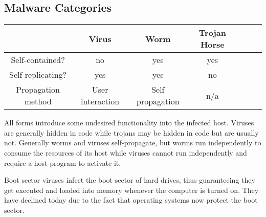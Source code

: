 \documentclass{math}
\begin{document}
\subsection*{Malware Categories}
\begin{center}
  \begin{tabular}{|c|c|c|c|c|c|c|}
    \hline
    & Virus & Worm & Trojan Horse \\
    \hline
    Self-contained? & no & yes & yes \\
    Self-replicating? & yes & yes & no  \\
    Propagation method & User interaction & Self propagation & n/a \\
    \hline
  \end{tabular}
\end{center}
All forms introduce some undesired functionality into the infected host.
Viruses are generally hidden in code while trojans may be hidden in code but
are usually not. Generally worms and viruses self-propagate, but worms run
independently to consume the resources of its host while viruses cannot run
independently and require a host program to activate it. \par
Boot sector viruses infect the boot sector of hard drives, thus guaranteeing
they get executed and loaded into memory whenever the computer is turned on.
They have declined today due to the fact that operating systems now protect
the boot sector.
\end{document}
